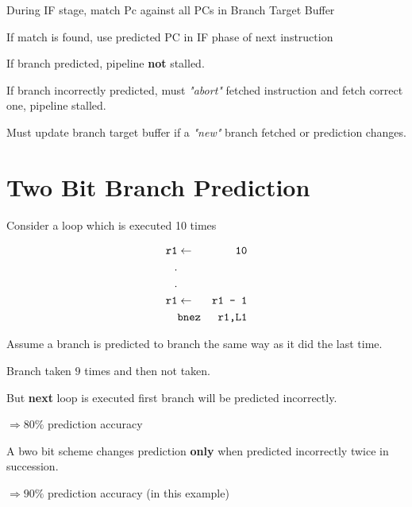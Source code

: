 \documentclass[a4paper,12pt]{article}
\begin{document}
During IF stage, match Pc against all PCs in Branch Target Buffer

If match is found, use predicted PC in IF phase of next instruction

If branch predicted, pipeline \textbf{not} stalled.

If branch incorrectly predicted, must \emph{"abort"} fetched instruction
and fetch correct one, pipeline stalled.

Must update branch target buffer if a \emph{"new"} branch fetched or
prediction changes.

\section*{Two Bit Branch Prediction}

Consider a loop which is executed 10 times

\begin{eqnarray*}
\verb!r1! & \leftarrow	& \verb!10! \\
		  . & 	& \\
		  . & 	& \\
\verb!r1! & \leftarrow	& \verb!r1 - 1! \\
			 & \verb!bnez!	& \verb!r1,L1! \\
\end{eqnarray*}

Assume a branch is predicted to branch the same way as it did the last
time.

Branch taken $9$ times and then not taken.

But \textbf{next} loop is executed first branch will be predicted
incorrectly.

\indent $\Rightarrow 80\%$ prediction accuracy

A bwo bit scheme changes prediction \textbf{only} when predicted
incorrectly twice in succession.

\indent $\Rightarrow 90\%$ prediction accuracy (in this example)
\end{document}
